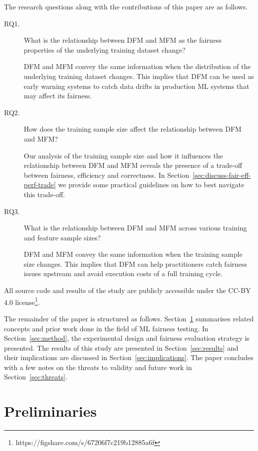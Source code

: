 \documentclass[conference,review,anonymous]{IEEEtran}
\begin{document}
The research questions along with the contributions of this paper are
as follows.
\begin{description}
  \item[RQ1.] What is the relationship between DFM and MFM as the
    fairness properties of the underlying training dataset change?

    DFM and MFM convey the same information when the distribution of
    the underlying training dataset changes. This implies that DFM can
    be used as early warning systems to catch data drifts in
    production ML systems that may affect its fairness.

  \item[RQ2.] How does the training sample size affect the
    relationship between DFM and MFM?

    Our analysis of the training sample size and how it influences the
    relationship between DFM and MFM reveals the presence of a
    trade-off between fairness, efficiency and correctness. In
    Section \ref{sec:discuss-fair-eff-perf-trade} we provide some
    practical guidelines on how to best navigate this trade-off.

  \item[RQ3.] What is the relationship between DFM and MFM across
    various training and feature sample sizes?

    DFM and MFM convey the same information when the training sample
    size changes. This implies that DFM can help practitioners catch
    fairness issues upstream and avoid execution costs of a full
    training cycle.
\end{description}

All source code and results of the study are publicly accessible under
the CC-BY 4.0
license\footnote{https://figshare.com/s/67206f7c219b12885a6f}.

The remainder of the paper is structured as follows.
Section \ref{sec:related} summarises related concepts and prior work
done in the field of ML fairness testing. In Section \ref{sec:method},
the experimental design and fairness evaluation strategy is presented.
The results of this study are presented in Section \ref{sec:results}
and their implications are discussed in
Section \ref{sec:implications}. The paper concludes with a few notes
on the threats to validity and future work in
Section \ref{sec:threats}.

\section{Preliminaries}\label{sec:related}
\end{document}
